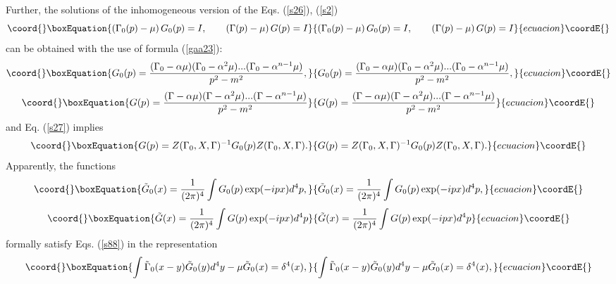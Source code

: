\documentclass[a4paper,a4paper]{article}
\begin{document}
Further, the solutions of the inhomogeneous version of the Eqs. (\ref{s26}),
(\ref{s2}) 
\begin{equation}\coord{}\boxEquation{
\left( \Gamma _{0}(p)-\mu \right) G_{0}(p)=I,\qquad \left( \Gamma (p)-\mu
\right) G(p)=I  \label{s88}
}{
\left( \Gamma _{0}(p)-\mu \right) G_{0}(p)=I,\qquad \left( \Gamma (p)-\mu
\right) G(p)=I  }{ecuacion}\coordE{}\end{equation}%
can be obtained with the use of formula (\ref{gaa23}): 
\begin{equation}\coord{}\boxEquation{
G_{0}(p)=\frac{(\Gamma _{0}-\alpha \mu )(\Gamma _{0}-\alpha ^{2}\mu
)...(\Gamma _{0}-\alpha ^{n-1}\mu )}{p^{2}-m^{2}},  \label{s89}
}{
G_{0}(p)=\frac{(\Gamma _{0}-\alpha \mu )(\Gamma _{0}-\alpha ^{2}\mu
)...(\Gamma _{0}-\alpha ^{n-1}\mu )}{p^{2}-m^{2}},  }{ecuacion}\coordE{}\end{equation}%
\begin{equation}\coord{}\boxEquation{
G(p)=\frac{(\Gamma -\alpha \mu )(\Gamma -\alpha ^{2}\mu )...(\Gamma -\alpha
^{n-1}\mu )}{p^{2}-m^{2}}  \label{sa89}
}{
G(p)=\frac{(\Gamma -\alpha \mu )(\Gamma -\alpha ^{2}\mu )...(\Gamma -\alpha
^{n-1}\mu )}{p^{2}-m^{2}}  }{ecuacion}\coordE{}\end{equation}%
and Eq. (\ref{s27}) implies 
\begin{equation}\coord{}\boxEquation{
G(p)=Z(\Gamma _{0},X,\Gamma )^{-1}G_{0}(p)Z(\Gamma _{0},X,\Gamma ).
\label{s90}
}{
G(p)=Z(\Gamma _{0},X,\Gamma )^{-1}G_{0}(p)Z(\Gamma _{0},X,\Gamma ).
}{ecuacion}\coordE{}\end{equation}%
Apparently, the functions 
\begin{equation}\coord{}\boxEquation{
\tilde{G}_{0}(x)=\frac{1}{(2\pi )^{4}}\int G_{0}(p)\exp (-ipx)d^{4}p,
\label{sa90}
}{
\tilde{G}_{0}(x)=\frac{1}{(2\pi )^{4}}\int G_{0}(p)\exp (-ipx)d^{4}p,
}{ecuacion}\coordE{}\end{equation}%
\begin{equation}\coord{}\boxEquation{
\tilde{G}(x)=\frac{1}{(2\pi )^{4}}\int G(p)\exp (-ipx)d^{4}p  \label{s91}
}{
\tilde{G}(x)=\frac{1}{(2\pi )^{4}}\int G(p)\exp (-ipx)d^{4}p  }{ecuacion}\coordE{}\end{equation}%
formally satisfy Eqs. (\ref{s88}) in the \coordHE{}representation 
\begin{equation}\coord{}\boxEquation{
\int \tilde{\Gamma}_{0}(x-y)\tilde{G}_{0}(y)d^{4}y-\mu \tilde{G}
_{0}(x)=\delta ^{4}(x),  \label{s92}
}{
\int \tilde{\Gamma}_{0}(x-y)\tilde{G}_{0}(y)d^{4}y-\mu \tilde{G}
_{0}(x)=\delta ^{4}(x),  }{ecuacion}\coordE{}\end{equation}%
\end{document}
